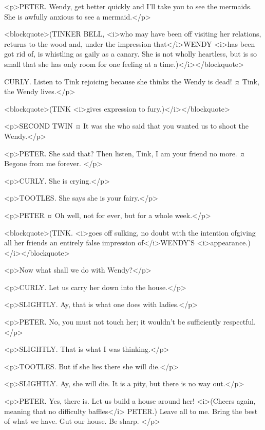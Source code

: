 <p>PETER. Wendy, get better quickly and I'll take you to see the mermaids. She is awfully anxious to see a mermaid.</p>

<blockquote>(TINKER BELL, <i>who may have been off visiting her relations, returns to the wood and, under the impression that</i>WENDY <i>has been got rid of, is whistling as gaily as a canary. She is not wholly heartless, but is so small that she has only room for one feeling at a time.)</i></blockquote>

CURLY. Listen to Tink rejoicing because she thinks the Wendy is dead!
¤
Tink, the Wendy lives.</p>

<blockquote>(TINK <i>gives expression to fury.)</i></blockquote>

<p>SECOND TWIN ¤
It was she who said that you wanted us to shoot the Wendy.</p>

<p>PETER. She said that? Then listen, Tink, I am your friend no more.
¤
Begone from me forever.
</p>

<p>CURLY. She is crying.</p>

<p>TOOTLES. She says she is your fairy.</p>

<p>PETER ¤
Oh well, not for ever, but for a whole week.</p>

<blockquote>(TINK. <i>goes off sulking, no doubt with the intention ofgiving all her friends an entirely false impression of</i>WENDY'S <i>appearance.)</i></blockquote>

<p>Now what shall we do with Wendy?</p>

<p>CURLY. Let us carry her down into the house.</p>

<p>SLIGHTLY. Ay, that is what one does with ladies.</p>

<p>PETER. No, you must not touch her; it wouldn't be sufficiently respectful.</p>

<p>SLIGHTLY. That is what I was thinking.</p>

<p>TOOTLES. But if she lies there she will die.</p>

<p>SLIGHTLY. Ay, she will die. It is a pity, but there is no way out.</p>

<p>PETER. Yes, there is. Let us build a house around her! <i>(Cheers again, meaning that no difficulty baffles</i> PETER.) Leave all to me. Bring the best of what we have. Gut our house. Be sharp.
</p>

